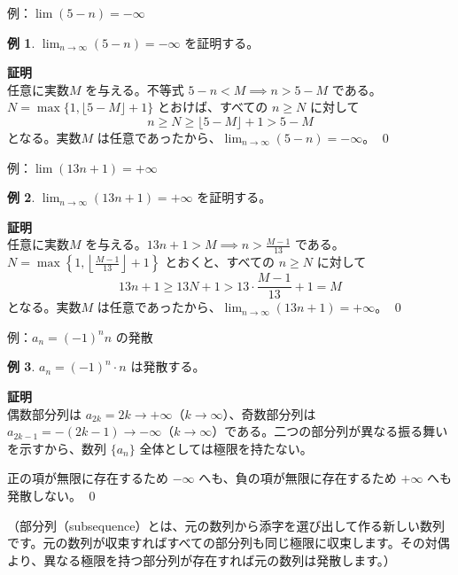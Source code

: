 \documentclass[11pt,a4paper]{jsarticle}
\theoremstyle{definition}
\newtheorem{example}{例}[section]
\newcommand{\kaisetsu}[1]{\textcolor{darkblue!70!black}{\small（#1）}}
\begin{document}
\begin{examplebox}{例：$\lim (5-n) = -\infty$}
\begin{example}\label{ex:5-n}
$\displaystyle\lim_{n \to \infty} (5 - n) = -\infty$ を証明する。

\textbf{証明}\ \\
\noindent
任意に実数$M$ を与える。不等式 $5 - n < M \implies n > 5 - M$ である。$N = \max\{1, \lfloor 5 - M \rfloor + 1\}$ とおけば、すべての $n \geq N$ に対して
\[
n \geq N \geq \lfloor 5 - M \rfloor + 1 > 5 - M
\]
となる。実数$M$ は任意であったから、$\displaystyle\lim_{n \to \infty} (5 - n) = -\infty$。 \qed
\end{example}
\end{examplebox}

\begin{examplebox}{例：$\lim (13n+1) = +\infty$}
\begin{example}\label{ex:13n}
$\displaystyle\lim_{n \to \infty} (13n + 1) = +\infty$ を証明する。

\textbf{証明}\ \\
\noindent
任意に実数$M$ を与える。$13n + 1 > M\implies n > \frac{M-1}{13}$ である。$N = \max\left\{1,\left\lfloor\frac{M-1}{13}\right\rfloor + 1\right\}$ とおくと、すべての $n \geq N$ に対して
\[
13n + 1 \geq 13N + 1 > 13 \cdot \frac{M-1}{13} + 1 = M
\]
となる。実数$M$ は任意であったから、$\displaystyle\lim_{n \to \infty} (13n + 1) = +\infty$。 \qed
\end{example}
\end{examplebox}

\begin{examplebox}{例：$a_n = (-1)^n n$ の発散}
\begin{example}\label{ex:alt-n}
$a_n = (-1)^n \cdot n$ は発散する。

\textbf{証明}\ \\
\noindent
偶数部分列は $a_{2k} = 2k \to +\infty$（$k \to \infty$）、奇数部分列は $a_{2k-1} = -(2k-1) \to -\infty$（$k \to \infty$）である。二つの部分列が異なる振る舞いを示すから、数列 $\{a_n\}$ 全体としては極限を持たない。

正の項が無限に存在するため $-\infty$ へも、負の項が無限に存在するため $+\infty$ へも発散しない。 \qed
\end{example}
\kaisetsu{部分列（subsequence）とは、元の数列から添字を選び出して作る新しい数列です。元の数列が収束すればすべての部分列も同じ極限に収束します。その対偶より、異なる極限を持つ部分列が存在すれば元の数列は発散します。}
\end{examplebox}
\end{document}
